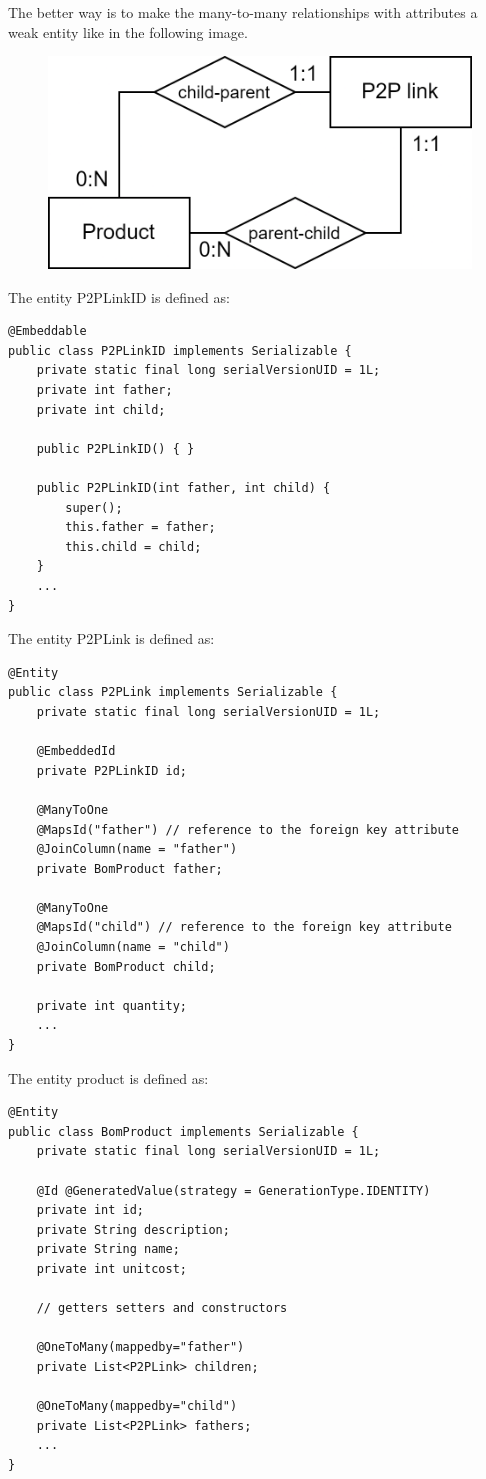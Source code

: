 The better way is to make the many-to-many relationships with attributes a weak entity like in the following image. 
\begin{figure}[H]
    \centering
    \includegraphics[width=0.5\linewidth]{images/BoMweak.png}
\end{figure}
The entity P2PLinkID is defined as:  
\begin{lstlisting}[style=Java]
@Embeddable
public class P2PLinkID implements Serializable {
    private static final long serialVersionUID = 1L;
    private int father;
    private int child;

    public P2PLinkID() { }

    public P2PLinkID(int father, int child) {
        super();
        this.father = father;
        this.child = child;
    }
    ...
}
\end{lstlisting}
The entity P2PLink is defined as:  
\begin{lstlisting}[style=Java]
@Entity
public class P2PLink implements Serializable {
    private static final long serialVersionUID = 1L;

    @EmbeddedId
    private P2PLinkID id;

    @ManyToOne
    @MapsId("father") // reference to the foreign key attribute
    @JoinColumn(name = "father")
    private BomProduct father;

    @ManyToOne
    @MapsId("child") // reference to the foreign key attribute
    @JoinColumn(name = "child")
    private BomProduct child;

    private int quantity;
    ...
}
\end{lstlisting}
The entity product is defined as:  
\begin{lstlisting}[style=Java]
@Entity
public class BomProduct implements Serializable {
    private static final long serialVersionUID = 1L;

    @Id @GeneratedValue(strategy = GenerationType.IDENTITY)
    private int id;
    private String description;
    private String name;
    private int unitcost;

    // getters setters and constructors

    @OneToMany(mappedby="father")
    private List<P2PLink> children;

    @OneToMany(mappedby="child")
    private List<P2PLink> fathers;
    ...
}
\end{lstlisting}
